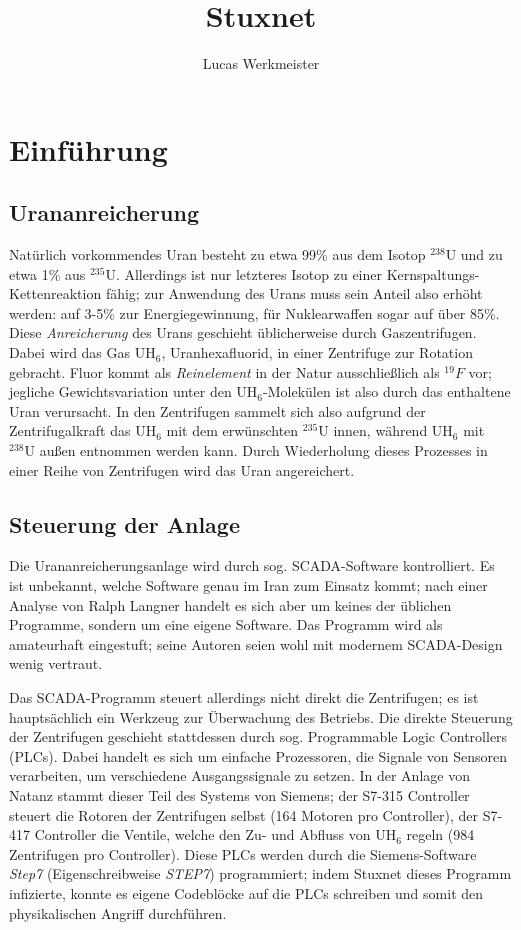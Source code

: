 \documentclass{article}
\title{Stuxnet}
\author{Lucas Werkmeister}
\begin{document}
\maketitle

\section{Einführung}

\subsection{Urananreicherung}

Natürlich vorkommendes Uran besteht zu etwa 99\% aus dem Isotop $^{238}\mathrm U$ und zu etwa 1\% aus $^{235}\mathrm U$.
Allerdings ist nur letzteres Isotop zu einer Kernspaltungs-Kettenreaktion fähig;
zur Anwendung des Urans muss sein Anteil also erhöht werden: auf 3-5\% zur Energiegewinnung, für Nuklearwaffen sogar auf über 85\%.
Diese \emph{Anreicherung} des Urans geschieht üblicherweise durch Gaszentrifugen.
Dabei wird das Gas $\mathrm{UH}_6$, Uranhexafluorid, in einer Zentrifuge zur Rotation gebracht.
Fluor kommt als \emph{Reinelement} in der Natur ausschließlich als $^{19}F$ vor;
jegliche Gewichtsvariation unter den $\mathrm{UH}_6$-Molekülen ist also durch das enthaltene Uran verursacht.
In den Zentrifugen sammelt sich also aufgrund der Zentrifugalkraft das $\mathrm{UH}_6$ mit dem erwünschten $^{235}\mathrm U$ innen,
während $\mathrm{UH}_6$ mit $^{238}\mathrm U$ außen entnommen werden kann.
Durch Wiederholung dieses Prozesses in einer Reihe von Zentrifugen wird das Uran angereichert.

\subsection{Steuerung der Anlage}

Die Urananreicherungsanlage wird durch sog. SCADA-Software kontrolliert.
Es ist unbekannt, welche Software genau im Iran zum Einsatz kommt;
nach einer Analyse von Ralph Langner handelt es sich aber um keines der üblichen Programme, %
sondern um eine eigene Software.
Das Programm wird als amateurhaft eingestuft;
seine Autoren seien wohl mit modernem SCADA-Design wenig vertraut. %

Das SCADA-Programm steuert allerdings nicht direkt die Zentrifugen;
es ist hauptsächlich ein Werkzeug zur Überwachung des Betriebs. %
Die direkte Steuerung der Zentrifugen geschieht stattdessen durch sog. Programmable Logic Controllers (PLCs).
Dabei handelt es sich um einfache Prozessoren, die Signale von Sensoren verarbeiten,
um verschiedene Ausgangssignale zu setzen.
In der Anlage von Natanz stammt dieser Teil des Systems von Siemens;
der S7-315 Controller steuert die Rotoren der Zentrifugen selbst (164 Motoren pro Controller), %
der S7-417 Controller die Ventile, welche den Zu- und Abfluss von $\mathrm{UH}_6$ regeln (984 Zentrifugen pro Controller).
Diese PLCs werden durch die Siemens-Software \emph{Step7} (Eigenschreibweise \emph{STEP7}) programmiert;
indem Stuxnet dieses Programm infizierte, konnte es eigene Codeblöcke auf die PLCs schreiben
und somit den physikalischen Angriff durchführen.
\end{document}
